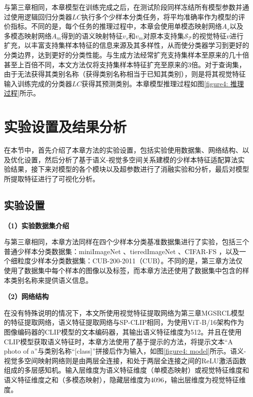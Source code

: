 与第三章相同，本章模型在训练完成之后，在测试阶段同样冻结所有模型参数并通过使用逻辑回归分类器$LC$执行多个少样本分类任务，将平均准确率作为模型的评价指标。不同的是，每个任务的推理过程中，本章会使用单模态映射网络$A_s$以及多模态映射网络$A_m$得到的语义映射特征$v_s$和$v_m$对原本支持集$\mathcal{S}_{\mathcal{T}}$的视觉特征$v$进行扩充，以丰富支持集样本特征的信息来源及其多样性，从而使分类器学习到更好的分类边界，达到更好的分类性能。与生成方法经常扩充支持集样本至原来的几十倍甚至上百倍不同，本文方法仅将支持集样本特征扩充至原来的3倍。对于查询集，由于无法获得其类别名称（获得类别名称相当于已知其类别），则是将其视觉特征输入训练完成的分类器$LC$获得其预测类别。本章模型推理过程如图\ref{figure4: 推理过程}所示。

\section[\hspace{-2pt}实验设置及结果分析]{{\heiti{} \hspace{-8pt}实验设置及结果分析}}\label{section4: 实验设置及结果分析}

在本节中，首先介绍了本章方法的实验设置，包括实验使用数据集、网络结构、以及优化设置，然后分析了基于语义-视觉多空间关系建模的少样本特征适配算法实验结果，接下来对模型的各个模块以及超参数进行了消融实验和分析，最后对模型所提取特征进行了可视化分析。

\subsection[\hspace{-2pt}实验设置]{{\heiti{} \hspace{-8pt}实验设置}}\label{section4: 实验设置}

\textbf{（1）实验数据集介绍}

与第三章相同，本章方法同样在四个少样本分类基准数据集进行了实验，包括三个普通少样本分类数据集：miniImageNet \cite{vinyals2016matching}、tieredImageNet \cite{ren2018meta}、CIFAR-FS \cite{bertinetto2019meta}，以及一个细粒度少样本分类数据集：CUB-200-2011（CUB）\cite{wah2011caltech}。不同的是，第三章方法仅使用了数据集中每个样本的图像以及标签，而本章方法还使用了数据集中包含的样本类别名称来提供语义信息。

\textbf{（2）网络结构}

在没有特殊说明的情况下，本文所使用视觉特征提取网络为第三章MGSRCL模型的特征提取网络，语义特征提取网络与SP-CLIP\cite{SP-CLIP}相同，为使用ViT-B/16架构作为图像编码器的CLIP模型的文本编码器，其输出语义特征维度为512。并且在使用CLIP模型获取语义特征时，本章方法使用了基于提示的方法，将提示文本“A photo of a”与类别名称“[class]”拼接后作为输入，如图\ref{figure4: model}所示。语义-视觉多空间映射网络则是由两层全连接，和处于两层全连接之间的ReLU激活函数组成的多层感知机。输入层维度为语义特征维度（单模态映射）或视觉特征维度和语义特征维度之和（多模态映射），隐藏层维度为4096，输出层维度为视觉特征维度。

